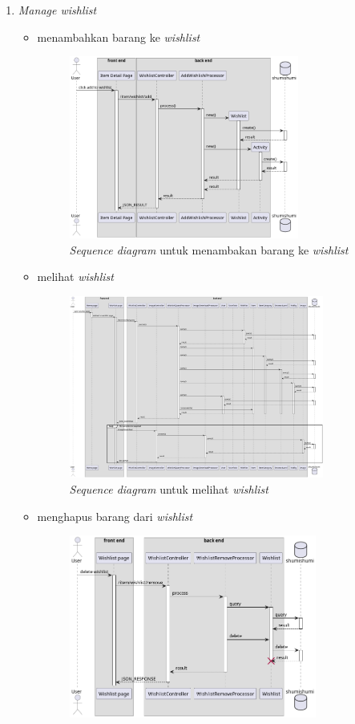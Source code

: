 \documentclass[a4paper]{article}
\begin{document}
\begin{enumerate}
\begin{enumerate}
        \item \textit{Manage wishlist}
        \begin{itemize}
            \item menambahkan barang ke \textit{wishlist}
            \begin{figure}[h]
                \centering
                \includegraphics*[height=6cm]{./diagram/sequence diagram/12. wishlist/add to wishlist/add to wishlist.png}
                \caption{\textit{Sequence diagram} untuk menambakan barang ke \textit{wishlist}}
            \end{figure}
            \newpage
            \item melihat \textit{wishlist}
            \begin{figure}[h]
                \centering
                \includegraphics*[height=6cm]{./diagram/sequence diagram/12. wishlist/query wishlist/query wishlist.png}
                \caption{\textit{Sequence diagram} untuk melihat \textit{wishlist}}
            \end{figure}
            \item menghapus barang dari \textit{wishlist}
            \begin{figure}[h]
                \centering
                \includegraphics*[height=6cm]{./diagram/sequence diagram/12. wishlist/remove from wishlist/remove from wishlist.png}

\end{figure}
\end{itemize}
\end{enumerate}
\end{enumerate}
\end{document}
